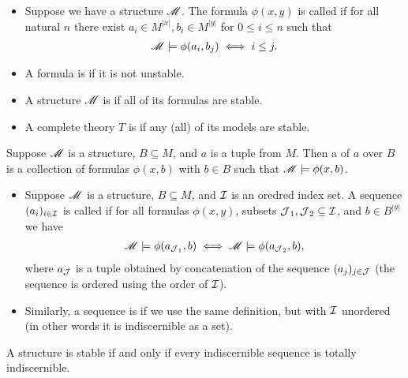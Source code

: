 \begin{Definition}
  \begin{itemize}
  \item Suppose we have a structure $\mathscr M$.
    The formula $\phi(x,y)$ is called  if for all natural $n$
    there exist $a_i \in M^{|x|}, b_i \in M^{|y|}$ for $0 \leq i \leq n$ such that
    \begin{align*}
      \mathscr M \models \phi(a_i, b_j) \iff i \leq j.
    \end{align*}
  \item A formula is  if it is not unstable.
  \item A structure $\mathscr M$ is  if all of its formulas are stable.
  \item A complete theory $T$ is  if any (all) of its models are stable.
  \end{itemize}
\end{Definition}

\begin{Definition}
  Suppose $\mathscr M$ is a structure, $B \subseteq M$, and $a$ is a tuple from $M$.
  Then a  of $a$ over $B$ is a collection of formulas $\phi(x, b)$ with $b \in B$
  such that $\mathscr M \models \phi(x, b)$.
\end{Definition}

\begin{Definition}
  \begin{itemize}
  \item Suppose $\mathscr M$ is a structure, $B \subseteq M$, and $\operatorname{\mathcal I}$ is an oredred index set. 
    A sequence $(a_i)_{i \in \operatorname{\mathcal I}}$ is called  if
    for all formulas $\phi(x,y)$, subsets $\operatorname{\mathcal J}_1, \operatorname{\mathcal J}_2 \subseteq \operatorname{\mathcal I}$, and $b \in B^{|y|}$ we have
    \begin{align*}
      \mathscr M \models \phi(a_{\operatorname{\mathcal J}_1}, b) \iff   \mathscr M \models \phi(a_{\operatorname{\mathcal J}_2}, b),
    \end{align*}
    where $a_{\operatorname{\mathcal J}}$ is a tuple obtained by concatenation of the sequence $(a_j)_{j \in \operatorname{\mathcal J}}$
    (the sequence is ordered using the order of $\operatorname{\mathcal I}$).    
  \item Similarly, a sequence is  if we use the same definition, but with $\operatorname{\mathcal I}$ unordered
    (in other words it is indiscernible as a set).
  \end{itemize}
\end{Definition}

\begin{Lemma}
  A structure is stable if and only if every indiscernible sequence is totally indiscernible.
\end{Lemma}

